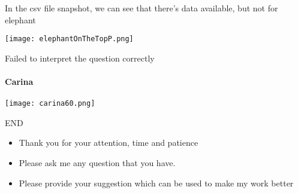 \documentclass{beamer}
\begin{document}
\begin{frame}{In the csv file snapshot, we can see that there's data available, but not for elephant}

\texttt{[image: elephantOnTheTopP.png]}

 
\end{frame}

\begin{frame}{Failed to interpret the question correctly}
\framesubtitle{Carina}

\texttt{[image: carina60.png]}

 
\end{frame}

\begin{frame}{END}



  \begin{itemize}
      \item Thank you for your attention, time and patience
      \item Please ask me any question that you have.
      \item Please provide your suggestion which can be used to make my work better
     

  \end{itemize}
 
\end{frame}
\end{document}
